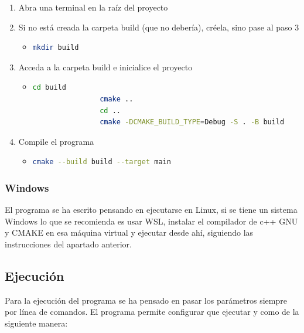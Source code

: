 \documentclass[a4paper, 12.5pt]{report}
\begin{document}
\begin{enumerate}
    \item Abra una terminal en la raíz del proyecto
    \item Si no está creada la carpeta build (que no debería), créela, sino pase al paso 3
          \begin{itemize}
              \item \begin{lstlisting}[language=bash]
				mkdir build
            \end{lstlisting}
          \end{itemize}
    \item Acceda a la carpeta build e inicialice el proyecto
          \begin{itemize}
              \item \begin{lstlisting}[language=bash]
				cd build
				cmake ..
				cd ..
				cmake -DCMAKE_BUILD_TYPE=Debug -S . -B build
            \end{lstlisting}
          \end{itemize}
    \item Compile el programa
          \begin{itemize}
              \item \begin{lstlisting}[language=bash]
				cmake --build build --target main
            \end{lstlisting}
          \end{itemize}
\end{enumerate}

\subsubsection{Windows}

El programa se ha escrito pensando en ejecutarse en Linux, si se tiene un sistema Windows lo que se recomienda es usar WSL, instalar el compilador de c++ GNU y CMAKE en esa máquina virtual y ejecutar desde ahí, siguiendo las instrucciones del apartado anterior.

\subsection{Ejecución}

Para la ejecución del programa se ha pensado en pasar los parámetros siempre por línea de comandos. El programa permite configurar que ejecutar y como de la siguiente manera:
\end{document}
